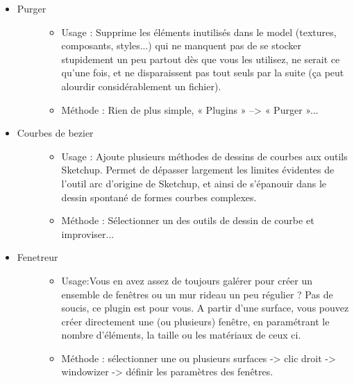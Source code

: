 \documentclass[a4paper,12pt,french]{sphinxmanual}
\begin{document}
\begin{itemize}
\item {} \begin{description}
\item[{Purger}] \leavevmode\begin{itemize}
\item {} 
Usage : Supprime les éléments inutilisés dans le model (textures, composants, styles...) qui ne manquent pas de se stocker stupidement un peu partout dès que vous les utilisez, ne serait ce qu'une fois, et ne disparaissent pas tout seuls par la suite (ça peut alourdir considérablement un fichier).

\item {} 
Méthode : Rien de plus simple,  « Plugins » --\textgreater{} « Purger »...

\end{itemize}

\end{description}

\item {} \begin{description}
\item[{Courbes de bezier}] \leavevmode\begin{itemize}
\item {} 
Usage : Ajoute plusieurs méthodes de dessins de courbes aux outils Sketchup. Permet de dépasser largement les limites évidentes de l'outil arc d'origine de Sketchup, et ainsi de s'épanouir dans le dessin spontané de formes courbes complexes.

\item {} 
Méthode : Sélectionner un des outils de dessin de courbe et improviser...

\end{itemize}

\end{description}

\item {} \begin{description}
\item[{Fenetreur}] \leavevmode\begin{itemize}
\item {} 
Usage:Vous en avez assez de toujours galérer pour créer un ensemble de fenêtres ou un mur rideau un peu régulier ? Pas de soucis, ce plugin est pour vous. A partir d'une surface, vous pouvez créer directement une (ou plusieurs) fenêtre, en paramétrant le nombre d'éléments, la taille ou les matériaux de ceux ci.

\item {} 
Méthode : sélectionner une ou plusieurs surfaces -\textgreater{} clic droit -\textgreater{} windowizer -\textgreater{} définir les paramètres des fenêtres.


\end{itemize}
\end{description}
\end{itemize}
\end{document}
